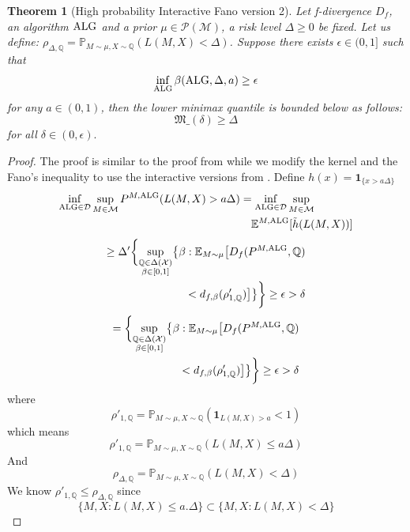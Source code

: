 \documentclass[conference]{IEEEtran}
\newtheorem{theorem}{Theorem}
\begin{document}
\begin{theorem}[High probability Interactive Fano version 2]
Let f-divergence $D_f$, an algorithm $\textup{ALG}$ and a prior $\mu \in \mathcal{P}(\mathcal{M})$, a risk level $\Delta \geq 0$ be fixed. Let us define:
$\rho_{\Delta,\mathbb{Q}} = \mathbb{P}_{M\sim\mu, X\sim\mathbb{Q}}(L(M,X) < \Delta)$. 
Suppose there exists $\epsilon \in (0,1]$ such that 
\[
  \inf_{\textup{ALG}}\beta(\textup{ALG}, \Delta, a) \geq \epsilon 
\] for any $a \in (0,1)$, then the lower minimax quantile is bounded below as follows:
\[
\mathfrak{M}\_(\delta) \geq \Delta
\] for all $\delta \in (0,\epsilon).$
\end{theorem}
\begin{proof}
The proof is similar to the proof from \cite[Lemma 7]{ma2024high} while we modify the kernel and the Fano's inequality to use the interactive versions from \cite{chen2024assouad}. 
Define $h(x) = \mathbf{1}_{\{x>a\Delta\}} $
\begin{align*}
\inf_{\textup{ALG} \in \mathcal{D}} \sup_{M \in \mathcal{M}} 
P^{M,\textup{ALG}}(L(M,X) > a\Delta) 
&= \inf_{\textup{ALG} \in \mathcal{D}} \sup_{M \in \mathcal{M}} \\
&\quad \mathbb{E}^{M,\textup{ALG}}[\tilde{h}(L(M,X))]
\end{align*}
\begin{align*}
\geq \Delta' \biggl\{ 
\sup_{\substack{\mathbb{Q} \in \Delta(\mathcal{X}) \\ \beta \in [0,1]}} 
\bigl\{ \beta : \mathbb{E}_{M \sim \mu} \bigl[ D_f(P^{M,\textup{ALG}}, \mathbb{Q}) \\
< d_{f,\beta}(\rho'_{1,\mathbb{Q}}) \bigr] \bigr\} 
\biggr\} 
\geq \epsilon > \delta
\end{align*}
\begin{align*}
= \biggl\{ 
\sup_{\substack{\mathbb{Q} \in \Delta(\mathcal{X}) \\ \beta \in [0,1]}} 
\bigl\{ \beta : \mathbb{E}_{M \sim \mu} \bigl[ D_f(P^{M,\textup{ALG}}, \mathbb{Q}) \\
< d_{f,\beta}(\rho'_{1,\mathbb{Q}}) \bigr] \bigr\} 
\biggr\} 
\geq \epsilon > \delta
\end{align*}
where
\[
\rho'_{1,\mathbb{Q}} = \mathbb{P}_{M\sim\mu, X\sim\mathbb{Q}}(\mathbf{1}_{L(M,X) > a} < 1)
\]
which means 
\[
\rho'_{1,\mathbb{Q}} = \mathbb{P}_{M\sim\mu, X\sim\mathbb{Q}}({L(M,X) \leq a\Delta})
\]
And
\[
\rho_{\Delta,\mathbb{Q}} = \mathbb{P}_{M\sim\mu, X\sim\mathbb{Q}}(L(M,X) < \Delta)
\]
We know $\rho'_{1,\mathbb{Q}}\leq\rho_{\Delta,\mathbb{Q}}$ since
\[
\{M,X: L(M,X)\leq a.\Delta\} \subset\{M,X: L(M,X)< \Delta\}
\]

\end{proof}
\fi
\end{document}
